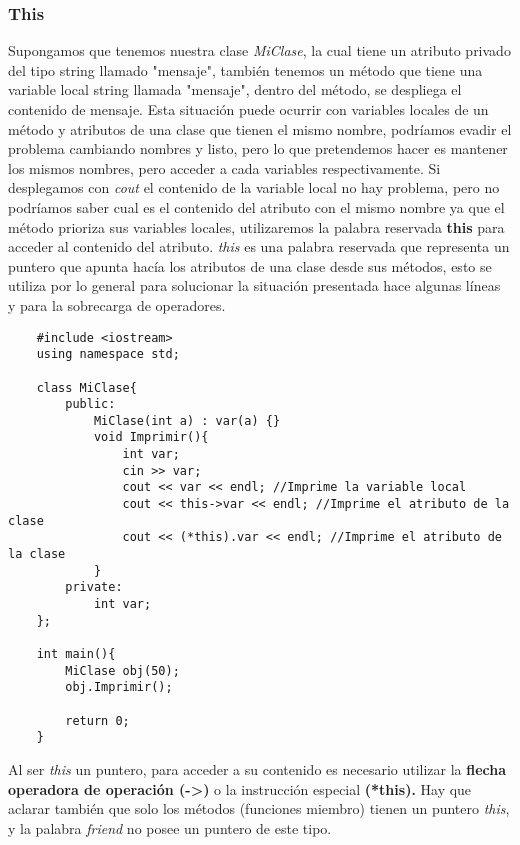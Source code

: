 \subsubsection{This}
Supongamos que tenemos nuestra clase \textit{MiClase}, la cual tiene un atributo privado del tipo string llamado "mensaje", también tenemos un método que tiene una variable local string llamada "mensaje", dentro del método, se despliega el contenido de mensaje. Esta situación puede ocurrir con variables locales de un método y atributos de una clase que tienen el mismo nombre, podríamos evadir el problema cambiando nombres y listo, pero lo que pretendemos hacer es mantener los mismos nombres, pero acceder a cada variables respectivamente. Si desplegamos con \textit{cout} el contenido de la variable local no hay problema, pero no podríamos saber cual es el contenido del atributo con el mismo nombre ya que el método prioriza sus variables locales, utilizaremos la palabra reservada \textbf{this} para acceder al contenido del atributo. \textit{this} es una palabra reservada que representa un puntero que apunta hacía los atributos de una clase desde sus métodos, esto se utiliza por lo general para solucionar la situación presentada hace algunas líneas y para la sobrecarga de operadores.
\begin{lstlisting}
    #include <iostream>
    using namespace std;

    class MiClase{
        public:
            MiClase(int a) : var(a) {}
            void Imprimir(){
                int var;
                cin >> var;
                cout << var << endl; //Imprime la variable local
                cout << this->var << endl; //Imprime el atributo de la clase
                cout << (*this).var << endl; //Imprime el atributo de la clase
            }
        private:
            int var;
    };
    
    int main(){
        MiClase obj(50);
        obj.Imprimir();
        
        return 0;
    }
\end{lstlisting}
Al ser \textit{this} un puntero, para acceder a su contenido es necesario utilizar la \textbf{flecha operadora de operación (->)} o la instrucción especial \textbf{(*this).} Hay que aclarar también que solo los métodos (funciones miembro) tienen un puntero \textit{this}, y la palabra \textit{friend} no posee un puntero de este tipo.



